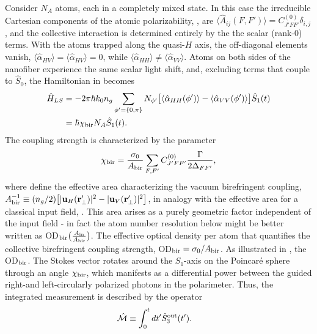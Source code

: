 \documentclass[preprint,aps,pra,onecolumn]{revtex4-1} %
\newcommand{\inp}{{\rm in}}
\newcommand{\chibir}{\chi_{\rm bir}}
\newcommand{\Abiref}{A_{\rm bir}}
\newcommand{\change}[1]{{\color{RoyalBlue} #1}}
\newcommand{\comment}[1]{{\color{Maroon} #1}}
\begin{document}
Consider $N_A$ atoms, each in a completely mixed state. In this case the irreducible Cartesian components of the atomic polarizability, , are $\langle \hat{A}_{ij}(F,F') \rangle = C_{J'FF'}^{(0)} \delta_{i,j}$, and the collective interaction is determined entirely by the the scalar (rank-0) terms.  With the atoms trapped along the quasi-$H$ axis, the off-diagonal elements vanish, $\langle \hat{\alpha}_{HV} \rangle = \langle \hat{\alpha}_{HV} \rangle =0$, while $\langle \hat{\alpha}_{HH} \rangle \neq  \langle \hat{\alpha}_{VV} \rangle$.  Atoms on both sides of the nanofiber experience the same scalar light shift, and, excluding terms that couple to $\hat{S}_0$, the Hamiltonian in  becomes
	\begin{align}
		\hat{H}_{LS} &= -2\pi \hbar k_0 n_g \sum_{\phi' = \{0,\pi \}} N_{\phi'} \big[ \expt{\hat{\alpha}_{HH}(\phi')}  - \expt{\hat{\alpha}_{VV}(\phi')} \big] \hat{S}_1(t)  \\
		& =  \hbar \chibir N_A \hat{S}_1(t).  \label{Eq::MixedHamiltonian}
	\end{align}
The coupling strength is characterized by the parameter 	
	\begin{equation} \label{Eq::RotationAngle}
		\chibir = \frac{\sigma_0}{\Abiref}  \sum_{F,F'}  C_{J'FF'}^{(0)} \frac{\Gamma}{2 \Delta_{FF'}},
	\end{equation}
where define the effective area characterizing the \change{vacuum} birefringent coupling, $\Abiref^{-1} \equiv (n_g/2) \big[ |\mathbf{u}_{H}(\br'_\perp)|^2 - |\mathbf{u}_{V}(\br'_\perp)| ^2 \big]$, in analogy with the effective area for a classical input field, . \comment{This area arises as a purely geometric factor independent of the input field - in fact the atom number resolution below might be better written as OD$_{\rm bir}\big( \smallfrac{A_\inp}{\Abiref} \big)$.  The effective optical density per atom that quantifies the collective birefringent coupling strength, OD$_{\rm bir} = \sigma_0/\Abiref$.  As illustrated in \frf{}, the OD$_{\rm bir}$. } The Stokes vector rotates around the $S_1$-axis on the Poincar\'{e} sphere through an angle $\chibir$, which manifests as a differential power between the guided right-and left-circularly polarized photons in the polarimeter. Thus, the integrated measurement is described by the operator
	\begin{align} \label{Eq::MeasOpAtomCounting}
		\hat{\mathcal{M}} & \equiv \int_0^t dt' \hat{S}^{\rm out}_3(t').
	\end{align} 
	
\end{document}

